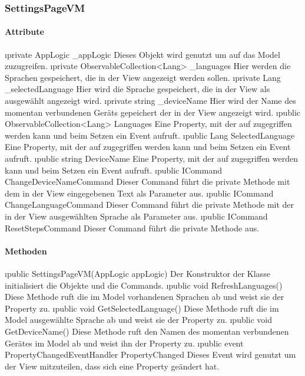 \documentclass[../entwurf.tex]{subfiles}
\begin{document}
\subsubsection{SettingsPageVM}
\paragraph{Attribute}
\begin{itemize}
	\i{private AppLogic \_appLogic} Dieses Objekt wird genutzt um auf das Model zuzugreifen.
	\i{private ObservableCollection<Lang> \_languages} Hier werden die Sprachen gespeichert, die in der View angezeigt werden sollen.
	\i{private Lang \_selectedLanguage} Hier wird die Sprache gespeichert, die in der View als ausgewählt angezeigt wird.
	\i{private string \_deviceName} Hier wird der Name des momentan verbundenen Geräts gepeichert der in der View angezeigt wird.
	\i{public ObservableCollection<Lang> Languages} Eine Property, mit der auf  zugegriffen werden kann und beim Setzen ein Event aufruft.
	\i{public Lang SelectedLanguage} Eine Property, mit der auf  zugegriffen werden kann und beim Setzen ein Event aufruft.
	\i{public string DeviceName} Eine Property, mit der auf  zugegriffen werden kann und beim Setzen ein Event aufruft.
	\i{public ICommand ChangeDeviceNameCommand} Dieser Command führt die private Methode  mit dem in der View eingegebenen Text als Parameter aus.
	\i{public ICommand ChangeLanguageCommand} Dieser Command führt die private Methode  mit der in der View ausgewählten Sprache als Parameter aus.
	\i{public ICommand ResetStepsCommand} Dieser Command führt die private Methode  aus.
\end{itemize}
\paragraph{Methoden}
\begin{itemize}
	\i{public SettingsPageVM(AppLogic appLogic)} Der Konstruktor der Klasse initialisiert die Objekte  und die Commands.
	\i{public void RefreshLanguages()} Diese Methode ruft die im Model vorhandenen Sprachen ab und weist sie der Property  zu.
	\i{public void GetSelectedLanguage()} Diese Methode ruft die im Model ausgewählte Sprache ab und weist sie der Property  zu.
	\i{public void GetDeviceName()} Diese Methode ruft den Namen des momentan verbundenen Gerätes im Model ab und weist ihn der Property  zu.
	\i{public event PropertyChangedEventHandler PropertyChanged} Dieses Event wird genutzt um der View mitzuteilen, dass sich eine Property geändert hat.
\end{itemize}
\end{document}
